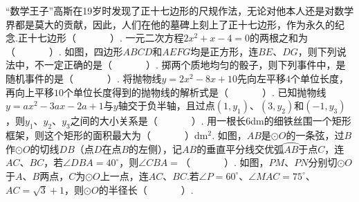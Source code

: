 \documentclass[10pt]{article}
\begin{document}
\showsecret
{}
\paperinformation
\begin{questions}{\selectingintroduction}
    \question ``数学王子''高斯在19岁时发现了正十七边形的尺规作法，无论对他本人还是对数学界都是莫大的贡献，因此，人们在他的墓碑上刻上了正十七边形，作为永久的纪念.正十七边形（~~~~~~~）.
    \question 一元二次方程$2x^2+x-4=0$的两根之和为（~~~~~~~）.
    \question 如图，四边形$ABCD$和$AEFG$均是正方形，连$BE$、$DG$，则下列说法中，不一定正确的是（~~~~~~~）.
    \question 掷两个质地均匀的骰子，则下列事件中，是随机事件的是（~~~~~~~）.
    \question 将抛物线$y=2x^2-8x+10$先向左平移$4$个单位长度，再向上平移$10$个单位长度得到的抛物线的解析式是（~~~~~~~）.
    \question 已知抛物线$y=ax^2-3ax-2a+1$与$y$轴交于负半轴，且过点$(1,y_1)$、$(3,y_2)$和$(-1,y_3)$，则$y_1$、$y_2$、$y_3$之间的大小关系是（~~~~~~~）.
    \question 用一根长$6$dm的细铁丝围一个矩形框架，则这个矩形的面积最大为（~~~~~~~）dm$^2$.
    \question 如图，$AB$是$\odot O$的一条弦，过$B$作$\odot O$的切线$DB$（点$D$在点$B$的左侧），记$AB$的垂直平分线交优弧$\wideparen{AB}$于点$C$，连$AC$、$BC$，若$\angle DBA=40^{\circ}$，则$\angle CBA=$（~~~~~~~）.
    \question 如图，$PM$、$PN$分别切$\odot O$于$A$、$B$两点，$C$为$\odot O$上一点，连$AC$、$BC$.若$\angle P=60^{\circ}$、$\angle MAC=75^{\circ}$、$AC=\sqrt{3}+1$，则$\odot O$的半径长（~~~~~~~）.
    \begin{figure}[!htb]
        \centering
\end{figure}
\end{questions}
\end{document}
